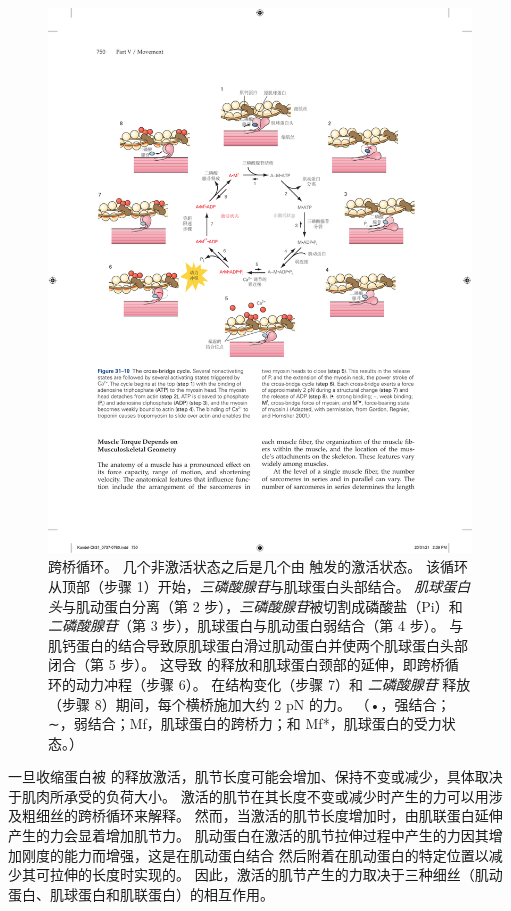 \begin{figure}[htbp]
	\centering
	\includegraphics[width=1.0\linewidth]{chap31/fig_31_10}
	\caption{跨桥循环。
	几个非激活状态之后是几个由  触发的激活状态。
	该循环从顶部（步骤 1）开始，\textit{三磷酸腺苷}与肌球蛋白头部结合。
	\textit{肌球蛋白头}与肌动蛋白分离（第 2 步），\textit{三磷酸腺苷}被切割成磷酸盐（Pi）和\textit{二磷酸腺苷}（第 3 步），肌球蛋白与肌动蛋白弱结合（第 4 步）。
	  与肌钙蛋白的结合导致原肌球蛋白滑过肌动蛋白并使两个肌球蛋白头部闭合（第 5 步）。
	这导致  的释放和肌球蛋白颈部的延伸，即跨桥循环的动力冲程（步骤 6）。
	在结构变化（步骤 7）和 \textit{二磷酸腺苷} 释放（步骤 8）期间，每个横桥施加大约 2 pN 的力。 （•，强结合；∼，弱结合；Mf，肌球蛋白的跨桥力；和 Mf*，肌球蛋白的受力状态。）\cite{gordon2001skeletal} }
	\label{fig:31_10}
\end{figure}


一旦收缩蛋白被  的释放激活，肌节长度可能会增加、保持不变或减少，具体取决于肌肉所承受的负荷大小。
激活的肌节在其长度不变或减少时产生的力可以用涉及粗细丝的跨桥循环来解释。
然而，当激活的肌节长度增加时，由肌联蛋白延伸产生的力会显着增加肌节力。
肌动蛋白在激活的肌节拉伸过程中产生的力因其增加刚度的能力而增强，这是在肌动蛋白结合  然后附着在肌动蛋白的特定位置以减少其可拉伸的长度时实现的。
因此，激活的肌节产生的力取决于三种细丝（肌动蛋白、肌球蛋白和肌联蛋白）的相互作用。



